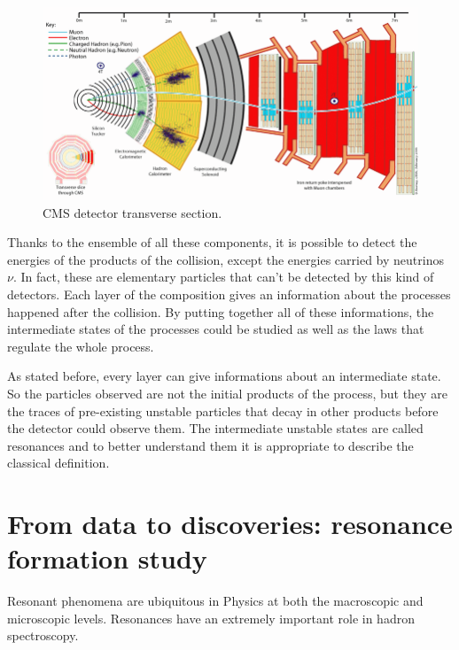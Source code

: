 \begin{figure}[t]
	\begin{center}
		\includegraphics[width=1.0\textwidth]{Images/LHC/cms_transverse_section.png}
		\caption{CMS detector transverse section.}
		\label{fig:CMS_TRANSVERSE_SECTION}
	\end{center}
\end{figure}

Thanks to the ensemble of all these components, it is possible to detect the energies of the products of the collision, except the energies carried by neutrinos $\nu$. In fact, these are elementary particles that can't be detected by this kind of detectors. Each layer of the composition gives an information about the processes happened after the collision. By putting together all of these informations, the intermediate states of the processes could be studied as well as the laws that regulate the whole process.

As stated before, every layer can give informations about an intermediate state. So the particles observed are not the initial products of the process, but they are the traces of pre-existing unstable particles that decay in other products before the detector could observe them. The intermediate unstable states are called resonances and to better understand them it is appropriate to describe the classical definition.





\section{From data to discoveries: resonance formation study}
Resonant phenomena are ubiquitous in Physics at both the macroscopic and microscopic levels. Resonances have an extremely important role in hadron spectroscopy.

